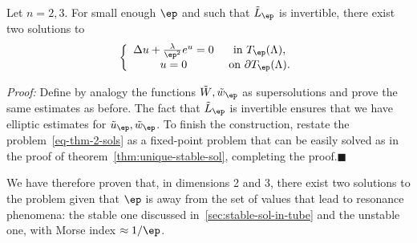 \begin{theorem}
    Let $n=2,3$. For small enough $\ep$ and such that $\tilde L_\ep$ is
    invertible, there exist two solutions to
    \begin{equation}
        \label{eq-thm-2-sols}
        \left\{
            \begin{array}{cc}
                \Delta u + \frac{\lambda}{\ep^2} e^u = 0 & \mbox{ in
                }T_\ep(\Lambda),\\
                    u=0 & \mbox{ on }\partial T_\ep(\Lambda).
                \end{array}
                \right.
    \end{equation}
    \end{theorem}
    \textit{Proof: } Define by analogy the functions $\tilde W, \tilde w_\ep$
    as supersolutions and prove the same estimates as before. The fact that
    $\tilde L_\ep$ is invertible ensures that we have elliptic estimates for
    $\tilde u_\ep, \tilde w_\ep$. To finish the construction, restate the
    problem~\ref{eq-thm-2-sols} as a fixed-point problem that can be easily
    solved as in the proof of theorem~\ref{thm:unique-stable-sol}, completing
    the proof.\hfill $\blacksquare$

    
    
    

    We have therefore proven that, in dimensions 2 and 3, there exist two
    solutions to the problem given that $\ep$ is away from the set of values
    that lead to resonance phenomena: the stable one discussed
    in~\ref{sec:stable-sol-in-tube} and the unstable one, with Morse index
    $\approx 1/\ep$.
